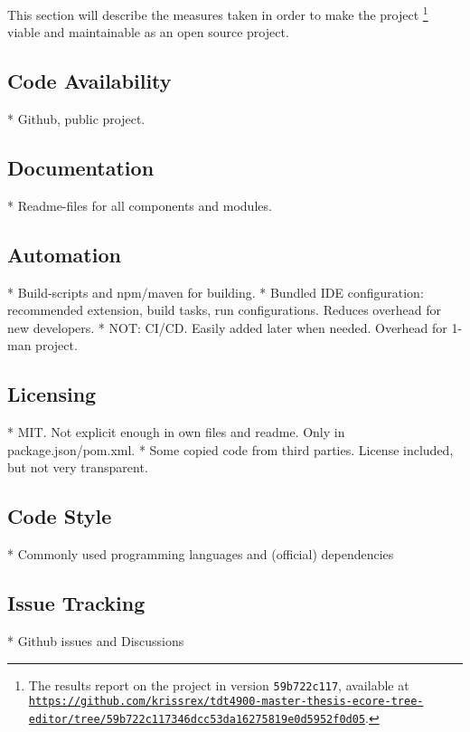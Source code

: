
This section will describe the measures taken in order to make the project%
\footnote{The results report on the project in version \texttt{59b722c117}, available at \href{https://github.com/krissrex/tdt4900-master-thesis-ecore-tree-editor/tree/59b722c117346dcc53da16275819e0d5952f0d05}{\nolinkurl{https://github.com/krissrex/tdt4900-master-thesis-ecore-tree-editor/tree/59b722c117346dcc53da16275819e0d5952f0d05}}.}
viable and maintainable as an \gls{open source} project.

\subsection{Code Availability}

* Github, public project.

\subsection{Documentation}
* Readme-files for all components and modules.

\subsection{Automation}
* Build-scripts and npm/maven for building.
* Bundled IDE configuration: recommended extension, build tasks, run configurations. Reduces overhead for new developers.
* NOT: CI/CD. Easily added later when needed. Overhead for 1-man project.

\subsection{Licensing}

* MIT. Not explicit enough in own files and readme. Only in package.json/pom.xml.
* Some copied code from third parties. License included, but not very transparent.

\subsection{Code Style}
* Commonly used programming languages and (official) dependencies

\subsection{Issue Tracking}
* Github issues and Discussions

